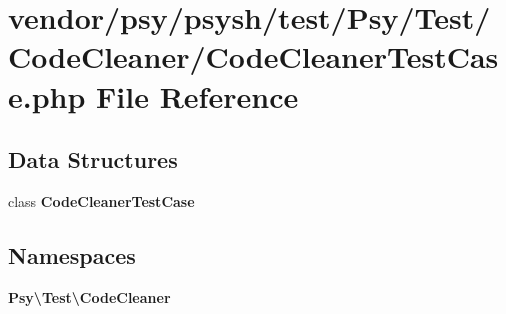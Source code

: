 \section{vendor/psy/psysh/test/\+Psy/\+Test/\+Code\+Cleaner/\+Code\+Cleaner\+Test\+Case.php File Reference}
\label{_code_cleaner_test_case_8php}
\subsection*{Data Structures}
\begin{DoxyCompactItemize}
\item 
class {\bf Code\+Cleaner\+Test\+Case}
\end{DoxyCompactItemize}
\subsection*{Namespaces}
\begin{DoxyCompactItemize}
\item 
 {\bf Psy\textbackslash{}\+Test\textbackslash{}\+Code\+Cleaner}
\end{DoxyCompactItemize}
